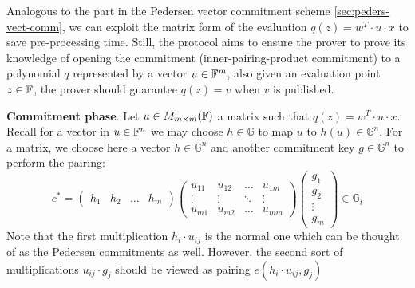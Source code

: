 \documentclass{article}
\begin{document}
Analogous to the part in the Pedersen vector commitment scheme \ref{sec:peders-vect-comm}, we can exploit the matrix form of the evaluation $q(z) = w^T \cdot u \cdot x$ to save pre-processing time. Still, the protocol aims to ensure the prover to prove its knowledge of opening the commitment (inner-pairing-product commitment) to a polynomial $q$ represented by a vector $u \in \mathbb{F}^m$, also given an evaluation point $z \in \mathbb{F}$, the prover should guarantee $q(z) = v$ when $v$ is published. 

\textbf{Commitment phase}. Let $u \in M_{m \times m}(\mathbb{F})$ a matrix such that $q(z) = w^T \cdot u \cdot x$. Recall for a vector in $u \in \mathbb{F}^n$ we may choose $h \in \mathbb{G}$ to map $u$ to $h(u) \in \mathbb{G}^n$. For a matrix, we choose here a vector $h \in \mathbb{G}^n$ and another commitment key $g \in \mathbb{G}^n$ to perform the pairing: 
\begin{equation*}
c^{\displaystyle *} = \begin{pmatrix}
h_1  &  h_2  & \dots &  h_m 
\end{pmatrix}
\begin{pmatrix}
u_{11}  & u_{12}   & \dots  & u_{1m} \\
\vdots & \vdots  & \ddots & \vdots \\
u_{m1}  & u_{m2}  &\dots     & u_{mm}
\end{pmatrix}
\begin{pmatrix}
g_1 \\
g_2 \\
\vdots \\
g_m
\end{pmatrix} \in \mathbb{G}_{t}
\end{equation*}
Note that the first multiplication $h_i \cdot u_{ij}$ is the normal one which can be thought of as the Pedersen commitments as well. However, the second sort of multiplications $u_{ij} \cdot g_j$ should be viewed as pairing $e(h_i \cdot u_{ij}, g_j)$
\end{document}
